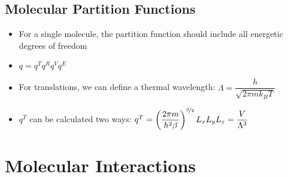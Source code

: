 \documentclass[12pt, openany, letterpaper]{memoir}
\begin{document}
\section{Molecular Partition Functions}
\begin{itemize}
	\item For a single molecule, the partition function should include all energetic degrees of freedom
	\item $q=q^Tq^Rq^Vq^E$
	\item For translations, we can define a thermal wavelength: $\Lambda = \dfrac{h}{\sqrt{2\pi mk_BT}}$
	\item $q^T$ can be calculated two ways: $q^T = \left(\dfrac{2\pi m}{h^2\beta}\right)^{\nicefrac{3}{2}}L_xL_yL_z = \dfrac{V}{\Lambda^3}$
\end{itemize}

\chapter{Molecular Interactions}
\end{document}
